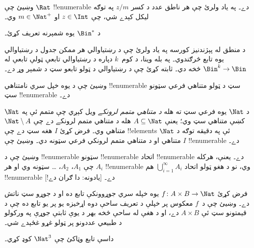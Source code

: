 \documentclass[../../../include/open-logic-section]{subfiles}
\begin{document}
\begin{prob}
وښيئ چې $\Rat$ !!{enumerable} دے۔ په ياد ولرئ چې هر ناطق عدد
د کسر $z/m$ په توګه ليکل کېدے شي، چې $z \in \Int$ او
$m \in \Nat^+$ وي۔
\end{prob}

\begin{prob}
د $\Bin^*$ يوه شمېرنه تعريف کړئ۔
\end{prob}

\begin{prob}
د منطق له پېژندنيز کورسه په ياد ولرئ چې د رښتياوالي هر ممکن
جدول د رښتياوالي يوه تابع څرګندوي۔ په بله وينا، د کوم~$k$
دپاره د رښتياوالي تابعې ټولې تابعې له $\Bin^k \to \Bin$ څخه
دي۔ ثابته کړئ چې د رښتياوالي د ټولو تابعو سټ د شمېر وړ دے۔
\end{prob}

\begin{prob}
وښيئ چې د يوه خپل سري نامتناهي !!{enumerable} سټ د ټولو
متناهي فرعي سټونو سټ !!{enumerable} دے۔
\end{prob}

\begin{prob}
د $\Nat$ يوه فرعي سټ ته هله \emph{د متناهي متمم لرونکے} ويل
کېږي چې متمم ئې په $\Nat$ کښې متناهي سټ وي؛ يعنې
$A \subseteq \Nat$ هله د متناهي متمم لرونکے دے چې
$\Nat\setminus A$ متناهي وي۔
فرض کړئ $I$ هغه سټ دے چې
!!{element}s ئې په دقيقه توګه د $\Nat$ متناهي او د متناهي
متمم لرونکي فرعي سټونه دي۔ وښيئ چې $I$ !!{enumerable} دے۔
\end{prob}

\begin{prob}
وښيئ چې د !!{enumerable} سټونو !!{enumerable} اتحاد
!!{enumerable} دے۔ يعنې، هرکله چې $A_1$، $A_2$، \dots{} سټونه
وي او هر $A_i$ !!{enumerable} وي، نو د هغو ټولو اتحاد
$\bigcup_{i=1}^\infty A_i$ هم !!{enumerable} دے۔ [يادونه:
دا ګران دے!]
\end{prob}

\begin{prob}
فرض کړئ $f \colon A \times B \to \Nat$ يوه خپله سري جوړوونکې
تابع ده او د جوړو سټ ناتش دے۔ وښيئ چې د~$f$ معکوس پر خپلې
د تعريف ساحې دوه اړخيزه يو پر يو تابع ده چې د قيمتونو سټ ئې
$A \times B$ دے، او د هغې له ساحې څخه بهر د يوې ثابتې جوړې
په ورکولو د طبيعي عددونو پر ټولو غړو غځېدے شي۔
\end{prob}

\begin{prob}
داسې تابع وټاکئ چې $\Nat^3$ کوډ کړي۔
\end{prob}
\end{document}
